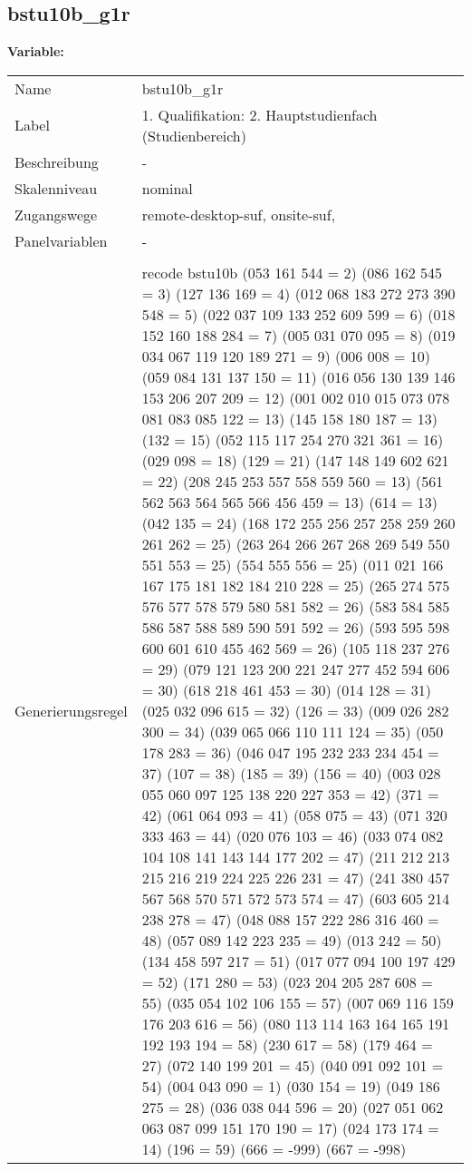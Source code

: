 	
	
	\subsection{bstu10b\_g1r}
	\label{subSection:bstu10b_g1r}

	\noindent\textbf{Variable:}\\
		\begin{tabular}{lL{11.3cm}}
			\label{tableVariable:bstu10b_g1r}
			Name & bstu10b\_g1r \\
			Label & 1. Qualifikation: 2. Hauptstudienfach (Studienbereich) \\
			Beschreibung & - \\
			Skalenniveau & nominal \\
			Zugangswege &
				remote-desktop-suf,
				onsite-suf,
 \\
			Panelvariablen & -
			 \\
			 \\
					Generierungsregel & recode bstu10b (053 161 544 = 2)  (086 162 545 = 3) (127 136 169 = 4) (012 068 183 272 273 390 548 = 5) (022 037 109 133 252 609 599 = 6) (018 152 160 188 284 = 7) (005 031 070 095 = 8) (019 034 067 119 120 189 271 = 9) (006 008 = 10) (059 084 131 137 150 = 11) (016 056 130 139 146 153 206 207 209   = 12) (001 002 010 015 073 078 081 083 085 122  = 13) (145 158 180 187 = 13) (132 = 15) (052 115 117 254 270 321 361 = 16) (029 098 = 18) (129 = 21) (147 148 149 602 621 = 22) (208 245 253 557 558 559 560 = 13) (561 562 563 564 565 566 456 459 = 13) (614 = 13) (042 135 = 24) (168 172 255 256 257 258 259 260 261 262  = 25) (263 264 266 267 268 269 549 550 551 553  = 25) (554 555 556 = 25) (011 021 166 167 175 181 182 184 210 228 = 25) (265 274 575 576 577 578 579 580 581 582 = 26) (583 584 585 586 587 588 589 590 591 592  = 26) (593 595 598 600 601 610 455 462 569 = 26) (105 118 237 276 = 29) (079 121 123 200 221 247 277 452 594 606 = 30) (618 218 461 453 = 30)  (014 128 = 31) (025 032 096 615 = 32) (126 = 33) (009 026 282 300 = 34) (039 065 066 110 111 124 = 35) (050 178 283 = 36) (046 047 195 232 233 234 454 = 37) (107 = 38)    (185 = 39) (156 = 40) (003 028 055 060 097 125 138 220 227 353 = 42)  (371 = 42)  (061 064 093 = 41) (058 075 = 43) (071 320 333 463 = 44)  (020 076 103 = 46) (033 074 082 104 108 141 143 144 177 202  = 47) (211 212 213 215 216 219 224 225 226 231  = 47) (241 380 457 567 568 570 571 572 573 574 = 47) (603 605 214 238 278 = 47) (048 088 157 222 286 316 460 = 48) (057 089 142 223 235 = 49) (013 242 = 50) (134 458 597 217 = 51) (017 077 094 100 197 429 = 52) (171 280 = 53) (023 204 205 287 608 = 55) (035 054 102 106 155 = 57) (007 069 116 159 176 203 616 = 56) (080 113 114 163 164 165 191 192 193 194  = 58) (230 617 = 58) (179 464 = 27) (072 140 199 201 = 45) (040 091 092 101 = 54) (004 043 090 = 1) (030 154 = 19) (049 186 275 = 28) (036 038 044 596 = 20) (027 051 062 063 087 099 151 170 190 = 17) (024 173 174 = 14) (196 = 59) (666 = -999) (667 = -998) 

\end{tabular}
